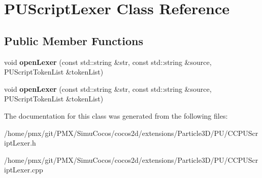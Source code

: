 \hypertarget{classPUScriptLexer}{}\section{P\+U\+Script\+Lexer Class Reference}
\label{classPUScriptLexer}
\subsection*{Public Member Functions}
\begin{DoxyCompactItemize}
\item 
\mbox{\label{classPUScriptLexer_a4739d479532f5b9a985060c8a7ac06df}} 
void {\bfseries open\+Lexer} (const std\+::string \&str, const std\+::string \&source, P\+U\+Script\+Token\+List \&token\+List)
\item 
\mbox{\label{classPUScriptLexer_a4739d479532f5b9a985060c8a7ac06df}} 
void {\bfseries open\+Lexer} (const std\+::string \&str, const std\+::string \&source, P\+U\+Script\+Token\+List \&token\+List)
\end{DoxyCompactItemize}


The documentation for this class was generated from the following files\+:\begin{DoxyCompactItemize}
\item 
/home/pmx/git/\+P\+M\+X/\+Simu\+Cocos/cocos2d/extensions/\+Particle3\+D/\+P\+U/C\+C\+P\+U\+Script\+Lexer.\+h\item 
/home/pmx/git/\+P\+M\+X/\+Simu\+Cocos/cocos2d/extensions/\+Particle3\+D/\+P\+U/C\+C\+P\+U\+Script\+Lexer.\+cpp\end{DoxyCompactItemize}
